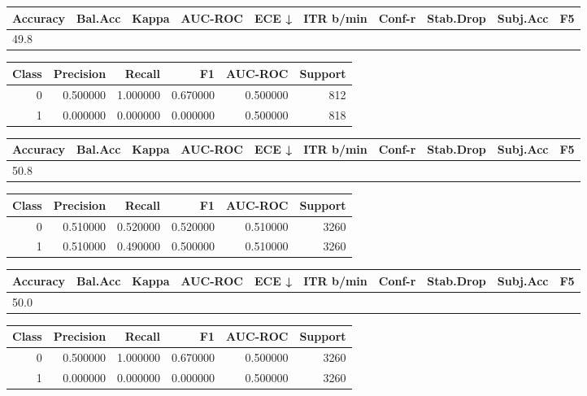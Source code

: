 \begin{tabular}{llrrrrrlll}
\toprule
Accuracy & Bal.Acc & Kappa & AUC-ROC & ECE ↓ & ITR b/min & Conf-r & Stab.Drop & Subj.Acc & F5 \\
\midrule
49.8%
\bottomrule
\end{tabular}


\begin{tabular}{rrrrrr}
\toprule
Class & Precision & Recall & F1 & AUC-ROC & Support \\
\midrule
0 & 0.500000 & 1.000000 & 0.670000 & 0.500000 & 812 \\
1 & 0.000000 & 0.000000 & 0.000000 & 0.500000 & 818 \\
\bottomrule
\end{tabular}


\begin{tabular}{llrrrrrlll}
\toprule
Accuracy & Bal.Acc & Kappa & AUC-ROC & ECE ↓ & ITR b/min & Conf-r & Stab.Drop & Subj.Acc & F5 \\
\midrule
50.8%
\bottomrule
\end{tabular}


\begin{tabular}{rrrrrr}
\toprule
Class & Precision & Recall & F1 & AUC-ROC & Support \\
\midrule
0 & 0.510000 & 0.520000 & 0.520000 & 0.510000 & 3260 \\
1 & 0.510000 & 0.490000 & 0.500000 & 0.510000 & 3260 \\
\bottomrule
\end{tabular}


\begin{tabular}{llrrrrrlll}
\toprule
Accuracy & Bal.Acc & Kappa & AUC-ROC & ECE ↓ & ITR b/min & Conf-r & Stab.Drop & Subj.Acc & F5 \\
\midrule
50.0%
\bottomrule
\end{tabular}


\begin{tabular}{rrrrrr}
\toprule
Class & Precision & Recall & F1 & AUC-ROC & Support \\
\midrule
0 & 0.500000 & 1.000000 & 0.670000 & 0.500000 & 3260 \\
1 & 0.000000 & 0.000000 & 0.000000 & 0.500000 & 3260 \\
\bottomrule
\end{tabular}


